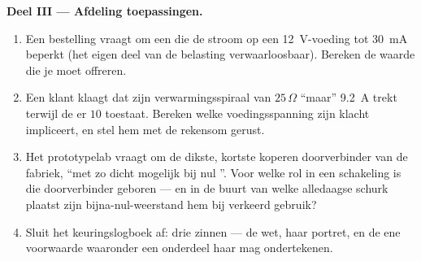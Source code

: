 \begin{problem}
\medskip\noindent\textbf{Deel III --- Afdeling toepassingen.}
\begin{enumerate}[resume]
  \item Een bestelling vraagt om een  die de stroom
        op een \qty{12}{V}-voeding tot \qty{30}{mA} beperkt (het
        eigen deel van de belasting verwaarloosbaar). Bereken de
        waarde die je moet offreren.
  \item Een klant klaagt dat zijn verwarmingsspiraal van
        $25\,\Omega$ ``maar'' \qty{9.2}{A} trekt terwijl de
         er $10$ toestaat. Bereken welke
        voedingsspanning zijn klacht impliceert, en stel
        hem met de rekensom gerust.
  \item Het prototypelab vraagt om de dikste, kortste koperen
        doorverbinder van de fabriek, ``met zo dicht mogelijk bij nul
        ''. Voor welke rol in een schakeling is die
        doorverbinder geboren --- en in de buurt van welke alledaagse
        schurk plaatst zijn bijna-nul-weerstand hem bij
        verkeerd gebruik?
  \item Sluit het keuringslogboek af: drie zinnen --- de wet, haar
        portret, en de ene voorwaarde waaronder een onderdeel haar
        mag ondertekenen.
\end{enumerate}
\end{problem}
